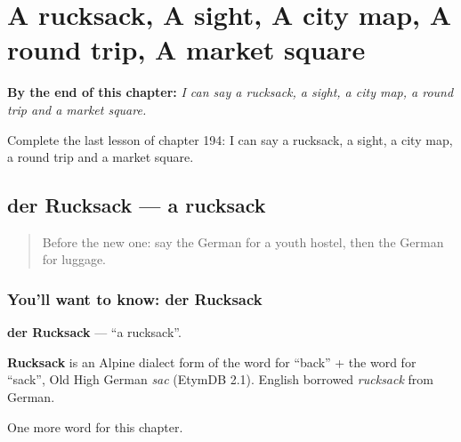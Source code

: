 
\chapter{A rucksack, A sight, A city map, A round trip, A market square}
\label{ch:ge-a-rucksack-a-sight-a-city-map-a-round-trip-a-market-square}

\begin{chapteropening}
\textbf{By the end of this chapter:} \emph{I can say a rucksack, a sight, a city map, a round trip and a market square.}

Complete the last lesson of chapter 194: I can say a rucksack, a sight, a city map, a round trip and a market square.
\end{chapteropening}

\section[der Rucksack]{der Rucksack — a rucksack}

\label{lesson:GE-C194-rucksack}



\begin{quote}
Before the new one: say the German for a youth hostel, then the German for luggage.
\end{quote}

\subsection*{You'll want to know: der Rucksack}
\textbf{der Rucksack} — \textquotedblleft{}a rucksack\textquotedblright{}.

\begin{cousinweb}
\textbf{Rucksack} is an Alpine dialect form of the word for \textquotedblleft{}back\textquotedblright{} + the word for \textquotedblleft{}sack\textquotedblright{}, Old High German \emph{sac} (EtymDB 2.1). English borrowed \emph{rucksack} from German.
\end{cousinweb}

\begin{grammarlens}[title={What you've built}]
One more word for this chapter.
\end{grammarlens}

